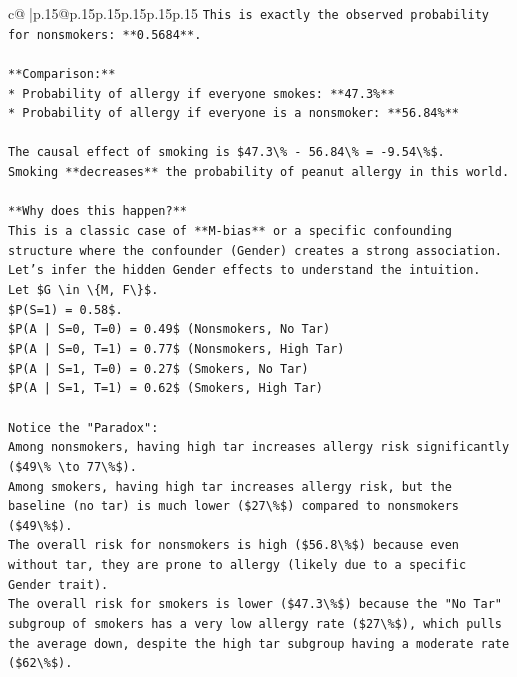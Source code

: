 \documentclass{article}
\begin{document}
{\begin{supertabular}{c@{$\;$}|p{.15\linewidth}@{}p{.15\linewidth}p{.15\linewidth}p{.15\linewidth}p{.15\linewidth}p{.15\linewidth}}
{{{\texttt{This is exactly the observed probability for nonsmokers: **0.5684**.} \\
\\ 
\texttt{**Comparison:**} \\
\texttt{*   Probability of allergy if everyone smokes: **47.3\%**} \\
\texttt{*   Probability of allergy if everyone is a nonsmoker: **56.84\%**} \\
\\ 
\texttt{The causal effect of smoking is \$47.3\textbackslash{}\% {-} 56.84\textbackslash{}\% = {-}9.54\textbackslash{}\%\$.} \\
\texttt{Smoking **decreases** the probability of peanut allergy in this world.} \\
\\ 
\texttt{**Why does this happen?**} \\
\texttt{This is a classic case of **M{-}bias** or a specific confounding structure where the confounder (Gender) creates a strong association.} \\
\texttt{Let's infer the hidden Gender effects to understand the intuition.} \\
\texttt{Let \$G \textbackslash{}in \textbackslash{}\{M, F\textbackslash{}\}\$.} \\
\texttt{\$P(S=1) = 0.58\$.} \\
\texttt{\$P(A | S=0, T=0) = 0.49\$ (Nonsmokers, No Tar)} \\
\texttt{\$P(A | S=0, T=1) = 0.77\$ (Nonsmokers, High Tar)} \\
\texttt{\$P(A | S=1, T=0) = 0.27\$ (Smokers, No Tar)} \\
\texttt{\$P(A | S=1, T=1) = 0.62\$ (Smokers, High Tar)} \\
\\ 
\texttt{Notice the "Paradox":} \\
\texttt{Among nonsmokers, having high tar increases allergy risk significantly (\$49\textbackslash{}\% \textbackslash{}to 77\textbackslash{}\%\$).} \\
\texttt{Among smokers, having high tar increases allergy risk, but the baseline (no tar) is much lower (\$27\textbackslash{}\%\$) compared to nonsmokers (\$49\textbackslash{}\%\$).} \\
\texttt{The overall risk for nonsmokers is high (\$56.8\textbackslash{}\%\$) because even without tar, they are prone to allergy (likely due to a specific Gender trait).} \\
\texttt{The overall risk for smokers is lower (\$47.3\textbackslash{}\%\$) because the "No Tar" subgroup of smokers has a very low allergy rate (\$27\textbackslash{}\%\$), which pulls the average down, despite the high tar subgroup having a moderate rate (\$62\textbackslash{}\%\$).} \\
}}}
\end{supertabular}}
\end{document}
